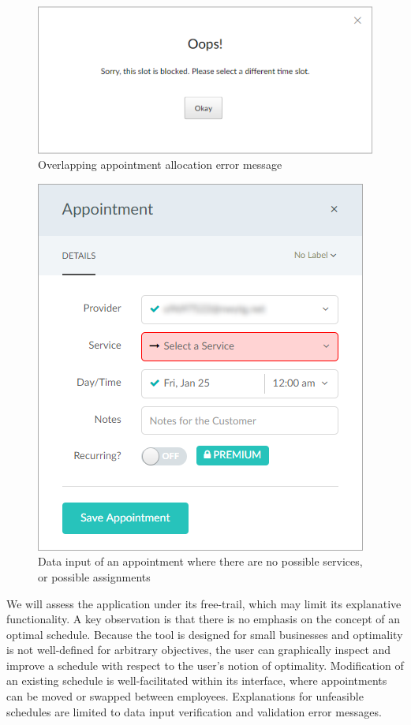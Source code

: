 \begin{figure}[H]
	\begin{center}
		\includegraphics[width=\textwidth]{figures/setmore_overallocated.png}
	\end{center}
	\caption{Overlapping appointment allocation error message}
\end{figure}

\begin{figure}[H]
	\begin{center}
		\includegraphics[scale=0.6]{figures/setmore_no_service.png}
	\end{center}
	\caption{Data input of an appointment where there are no possible services, or possible assignments}
\end{figure}

We will assess the application under its free-trail, which may limit its explanative functionality. A key observation is that there is no emphasis on the concept of an optimal schedule. Because the tool is designed for small businesses and optimality is not well-defined for arbitrary objectives, the user can graphically inspect and improve a schedule with respect to the user's notion of optimality. Modification of an existing schedule is well-facilitated within its interface, where appointments can be moved or swapped between employees. Explanations for unfeasible schedules are limited to data input verification and validation error messages.

